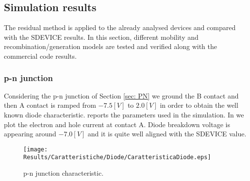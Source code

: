 %
%
%

\subsection{Simulation results}

The residual method is applied to the already analysed devices and compared with the SDEVICE results. In this section, different mobility and recombination/generation models are tested and verified along with the commercial code results.

\subsubsection{p-n junction}

Considering the p-n junction of Section \ref{sec: PN} we ground the B contact and then A contact is ramped from $-7.5[V]$ to $2.0[V]$ in order to obtain the well known diode characteristic. 
 reports the parameters used in the simulation.
In   we plot the electron and hole current at contact A.
Diode breakdown voltage is appearing around $-7.0[V]$ and it is quite well aligned with the SDEVICE value.

\vspace{0.5cm}

\begin{figure}[!h]
\centering
\texttt{[image: Results/Caratteristiche/Diode/CaratteristicaDiode.eps]}
\caption{p-n junction characteristic.}
\label{fig: caratteristica diode}
\end{figure}

\vspace{0.5cm}

